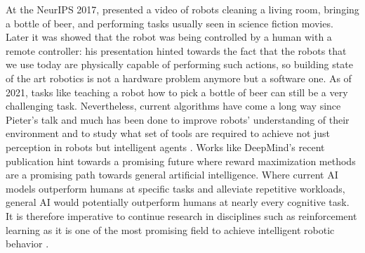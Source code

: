 At the NeurIPS 2017, \textcite{abbeel_youtube_2017} presented a video of robots cleaning a living room, bringing a bottle of beer, and performing tasks usually seen in science fiction movies.
Later it was showed that the robot was being controlled by a human with a remote controller: his presentation hinted towards the fact that the robots that we use today are physically capable of performing such actions, so building state of the art robotics is not a hardware problem anymore but a software one.
As of 2021, tasks like teaching a robot how to pick a bottle of beer can still be a very challenging task. Nevertheless, current algorithms have come a long way since Pieter's talk and much has been done to improve robots' understanding of their environment and to study what set of tools are required to achieve not just perception in robots but intelligent agents \cite{kok2020trust, trivedi2008soft}.
Works like DeepMind's recent publication \cite{silver2021reward} hint towards a promising future where reward maximization methods are a promising path towards general artificial intelligence. Where current AI models outperform humans at specific tasks and alleviate repetitive workloads, general AI would potentially outperform humans at nearly every cognitive task. 
It is therefore imperative to continue research in disciplines such as reinforcement learning as it is one of the most promising field to achieve intelligent robotic behavior \cite{abbeel_youtube_2017, kok2020trust, silver2021reward}.



